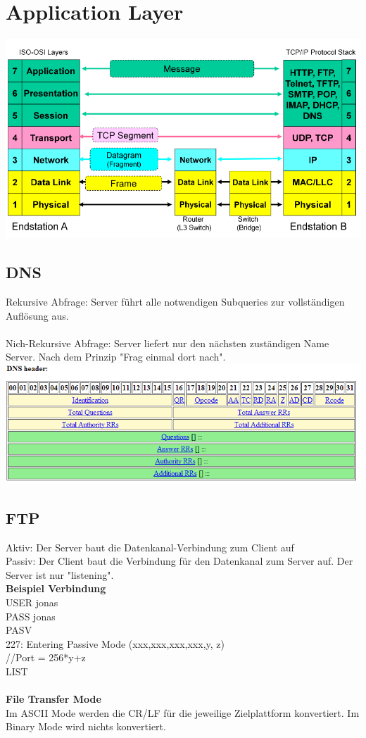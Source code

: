 \section{Application Layer}
\includegraphics[scale=0.5]{media/osimodel.png}
\subsection{DNS}
Rekursive Abfrage: Server führt alle notwendigen Subqueries zur vollständigen Auflösung aus.\\\\
Nich-Rekursive Abfrage: Server liefert nur den nächsten zuständigen Name Server. Nach dem Prinzip "Frag einmal dort nach".\\
\includegraphics[scale=0.8]{media/DNSHeader.png}

\subsection{FTP}
Aktiv: Der Server baut die Datenkanal-Verbindung zum Client auf\\
Passiv: Der Client baut die Verbindung für den Datenkanal zum Server auf. Der Server ist nur "listening".\\
\textbf{Beispiel Verbindung} \\
USER jonas\\
PASS jonas\\
PASV\\
227: Entering Passive Mode (xxx,xxx,xxx,xxx,y, z)\\
//Port = 256*y+z\\
LIST\\
\\
\textbf{File Transfer Mode}\\
Im ASCII Mode werden die CR/LF für die jeweilige Zielplattform konvertiert.
Im Binary Mode wird nichts konvertiert.

